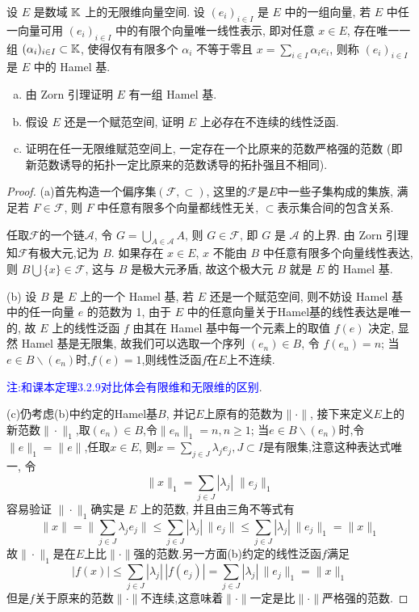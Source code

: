 \begin{exercise}
    设 $E$ 是数域 $\mathbb{K}$ 上的无限维向量空间. 设 $(e_i)_{i\in I}$
    是 $E$ 中的一组向量, 若 $E$ 中任一向量可用 $(e_i)_{i\in I}$
    中的有限个向量唯一线性表示, 即对任意 $x\in E$, 存在唯一一组 $(\alpha_i)_{i\in I}\subset\mathbb{K}$,
    使得仅有有限多个 $\alpha_i$ 不等于零且 $x=\sum_{i\in I}\alpha_ie_i$,
    则称 $(e_i)_{i\in I}$ 是 $E$ 中的 Hamel 基.
    \begin{enumerate}[(a)]
        \item 由 Zorn 引理证明 $E$ 有一组 Hamel 基.
        \item 假设 $E$ 还是一个赋范空间, 证明 $E$ 上必存在不连续的线性泛函.
        \item 证明在任一无限维赋范空间上, 一定存在一个比原来的范数严格强的范数
              (即新范数诱导的拓扑一定比原来的范数诱导的拓扑强且不相同).
    \end{enumerate}
\end{exercise}

\begin{proof}
(a)首先构造一个偏序集$(\mathcal{F},\subset)$, 这里的$\mathcal{F}$是$E$中一些子集构成的集族,
满足若 $F\in\mathcal{F}$, 则 $F$ 中任意有限多个向量都线性无关, $\subset$表示集合间的包含关系.

任取$\mathcal{F}$的一个链$\mathcal{A}$,
令 $G=\bigcup_{A\in\mathcal{A}}A$, 则 $G\in\mathcal{F}$,
即 $G$ 是 $\mathcal{A}$ 的上界. 由 Zorn 引理知$\mathcal{F}$有极大元,记为 $B$.
如果存在 $x\in E$, $x$ 不能由 $B$ 中任意有限多个向量线性表达,
则 $B\bigcup\{x\}\in\mathcal{F}$, 这与 $B$ 是极大元矛盾, 故这个极大元 $B$ 就是 $E$ 的 Hamel 基.

(b) 设 $B$ 是 $E$ 上的一个 Hamel 基, 若 $E$ 还是一个赋范空间,
则不妨设 Hamel 基中的任一向量 $e$ 的范数为 1,
由于 $E$ 中的任意向量关于Hamel基的线性表达是唯一的,
故 $E$ 上的线性泛函 $f$ 由其在 Hamel 基中每一个元素上的取值 $f(e)$ 决定,
显然 Hamel 基是无限集, 故我们可以选取一个序列 $(e_n)\in B$,
令 $f(e_n)=n$; 当$e\in B\backslash(e_n)$时,$f(e)=1$,则线性泛函$f$在$E$上不连续.

\textcolor{blue}{注:和课本定理3.2.9对比体会有限维和无限维的区别}.

(c)仍考虑(b)中约定的Hamel基$B$, 并记$E$上原有的范数为$\|\cdot\|$,
接下来定义$E$上的新范数$\|\cdot\|_1$,取$(e_n)\in B$,令$\|e_n\|_1=n,n\geq 1$;
当$e\in B\backslash(e_n)$时,令$\|e\|_1=\|e\|$,任取$x\in E$,
则$x=\sum_{j\in J}\lambda_je_j,J\subset I$是有限集,注意这种表达式唯一,
令
\[\|x\|_1=\sum_{j\in J}|\lambda_j|\;\|e_j\|_1\]
容易验证 $\|\cdot\|_1$确实是 $E$ 上的范数, 并且由三角不等式有
\[\|x\|=\|\sum_{j\in J}\lambda_je_j\|\leq\sum_{j\in J}|\lambda_j|\,\|e_j\|\leq\sum_{j\in J}|\lambda_j|\,\|e_j\|_1=\|x\|_1\]
故$\|\cdot\|_1$是在$E$上比$\|\cdot\|$强的范数.另一方面(b)约定的线性泛函$f$满足
\[|f(x)|\leq\sum_{j\in J}|\lambda_j|\,|f(e_j)|=\sum_{j\in J}|\lambda_j|\,\|e_j\|_1=\|x\|_1\]
但是$f$关于原来的范数$\|\cdot\|$不连续,这意味着$\|\cdot\|$一定是比$\|\cdot\|$严格强的范数.
\end{proof}



